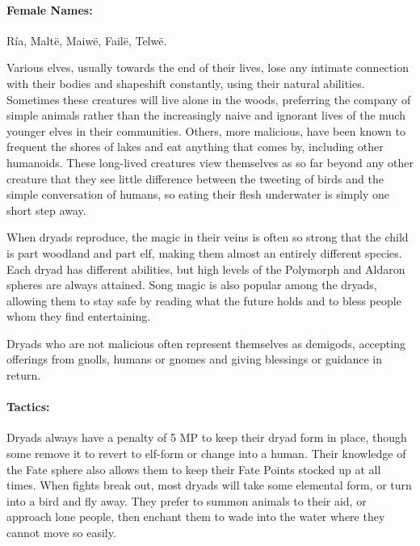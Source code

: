 \begin{multicols}{2}
\paragraph{Female Names:} R\'{i}a, Malt\"{e}, Maiw\"{e}, Fail\"{e}, Telw\"{e}.


\label{dryad}

Various elves, usually towards the end of their lives, lose any intimate connection with their bodies and shapeshift constantly, using their natural abilities.  Sometimes these creatures will live alone in the woods, preferring the company of simple animals rather than the increasingly naive and ignorant lives of the much younger elves in their communities.  Others, more malicious, have been known to frequent the shores of lakes and eat anything that comes by, including other humanoids.  These long-lived creatures view themselves as so far beyond any other creature that they see little difference between the tweeting of birds and the simple conversation of humans, so eating their flesh underwater is simply one short step away.

When dryads reproduce, the magic in their veins is often so strong that the child is part woodland and part elf, making them almost an entirely different species.
Each dryad has different abilities, but high levels of the Polymorph and Aldaron spheres are always attained.
Song magic is also popular among the dryads, allowing them to stay safe by reading what the future holds and to bless people whom they find entertaining.

Dryads who are not malicious often represent themselves as demigods, accepting offerings from gnolls, humans or gnomes and giving blessings or guidance in return.

\dryad

\paragraph{Tactics:}
Dryads always have a penalty of 5 MP to keep their dryad form in place, though some remove it to revert to elf-form or change into a human.
Their knowledge of the Fate sphere also allows them to keep their Fate Points stocked up at all times.
When fights break out, most dryads will take some elemental form, or turn into a bird and fly away.
They prefer to summon animals to their aid, or approach lone people, then enchant them to wade into the water where they cannot move so easily.


\end{multicols}

